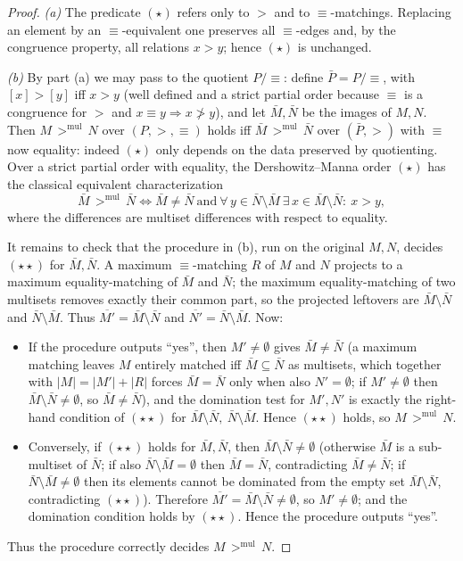 \documentclass{amsart}
\theoremstyle{definition}
\theoremstyle{remark}
\begin{document}
\begin{proof}
\emph{(a)} The predicate $(\star)$ refers only to $>$ and to $\equiv$-matchings.
Replacing an element by an $\equiv$-equivalent one preserves all $\equiv$-edges
and, by the congruence property, all relations $x>y$; hence $(\star)$ is
unchanged.

\emph{(b)} By part (a) we may pass to the quotient $P/\!\equiv$: define
$\bar P=P/\!\equiv$, with $[x]>[y]$ iff $x>y$ (well defined and a strict partial
order because $\equiv$ is a congruence for $>$ and $x\equiv y\Rightarrow x\not>y$),
and let $\bar M,\bar N$ be the images of $M,N$. Then
$M\,{>}^{\mathrm{mul}}\,N$ over $(P,>,\equiv)$ holds iff
$\bar M\,{>}^{\mathrm{mul}}\,\bar N$ over $(\bar P,>)$ with $\equiv$ now equality:
indeed $(\star)$ only depends on the data preserved by quotienting. Over a strict
partial order with equality, the Dershowitz--Manna order $(\star)$ has the
classical equivalent characterization \cite{DM}
\[
\bar M\,{>}^{\mathrm{mul}}\,\bar N \iff
\bar M\neq\bar N \ \text{and}\
\forall\, y\in \bar N\setminus\bar M\ \exists\, x\in \bar M\setminus\bar N:\ x>y,
\tag{$\star\star$}
\]
where the differences are multiset differences with respect to equality.

It remains to check that the procedure in (b), run on the original $M,N$, decides
$(\star\star)$ for $\bar M,\bar N$. A maximum $\equiv$-matching $R$ of $M$ and $N$
projects to a maximum equality-matching of $\bar M$ and $\bar N$; the maximum
equality-matching of two multisets removes exactly their common part, so the
projected leftovers are $\bar M\setminus\bar N$ and $\bar N\setminus\bar M$. Thus
$\overline{M'}=\bar M\setminus\bar N$ and $\overline{N'}=\bar N\setminus\bar M$.
Now:
\begin{itemize}
\item If the procedure outputs ``yes'', then $M'\neq\emptyset$ gives
$\bar M\neq\bar N$ (a maximum matching leaves $M$ entirely matched iff
$\bar M\subseteq\bar N$ as multisets, which together with $|M|=|M'|+|R|$ forces
$\bar M=\bar N$ only when also $N'=\emptyset$; if $M'\neq\emptyset$ then
$\bar M\setminus\bar N\neq\emptyset$, so $\bar M\neq\bar N$), and the domination
test for $M',N'$ is exactly the right-hand condition of $(\star\star)$ for
$\bar M\setminus\bar N,\ \bar N\setminus\bar M$. Hence $(\star\star)$ holds, so
$M\,{>}^{\mathrm{mul}}\,N$.
\item Conversely, if $(\star\star)$ holds for $\bar M,\bar N$, then
$\bar M\setminus\bar N\neq\emptyset$ (otherwise $\bar M$ is a sub-multiset of
$\bar N$; if also $\bar N\setminus\bar M=\emptyset$ then $\bar M=\bar N$,
contradicting $\bar M\neq\bar N$; if $\bar N\setminus\bar M\neq\emptyset$ then its
elements cannot be dominated from the empty set $\bar M\setminus\bar N$,
contradicting $(\star\star)$). Therefore $\overline{M'}=\bar M\setminus\bar N\neq
\emptyset$, so $M'\neq\emptyset$; and the domination condition holds by
$(\star\star)$. Hence the procedure outputs ``yes''.
\end{itemize}
Thus the procedure correctly decides $M\,{>}^{\mathrm{mul}}\,N$.


\end{proof}
\end{document}
